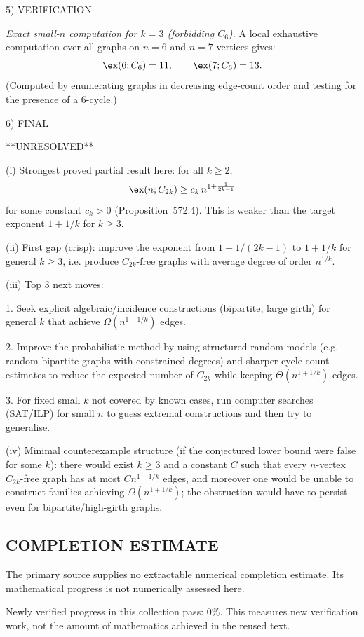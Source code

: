 5) VERIFICATION

\emph{Exact small-$n$ computation for $k=3$ (forbidding $C_6$).}
A local exhaustive computation over all graphs on $n=6$ and $n=7$ vertices gives:
\[
\ex(6;C_6)=11,\qquad \ex(7;C_6)=13.
\]
(Computed by enumerating graphs in decreasing edge-count order and testing for the presence of a $6$-cycle.)

6) FINAL

**UNRESOLVED**

(i) Strongest proved partial result here: for all $k\ge 2$,
\[
\ex(n;C_{2k}) \ge c_k\,n^{1+\frac{1}{2k-1}}
\]
for some constant $c_k>0$ (Proposition~572.4). This is weaker than the target exponent $1+1/k$ for $k\ge 3$.

(ii) First gap (crisp): improve the exponent from $1+1/(2k-1)$ to $1+1/k$ for general $k\ge 3$, i.e. produce $C_{2k}$-free graphs with average degree of order $n^{1/k}$.

(iii) Top 3 next moves:

1. Seek explicit algebraic/incidence constructions (bipartite, large girth) for general $k$ that achieve $\Omega(n^{1+1/k})$ edges.

2. Improve the probabilistic method by using structured random models (e.g. random bipartite graphs with constrained degrees) and sharper cycle-count estimates to reduce the expected number of $C_{2k}$ while keeping $\Theta(n^{1+1/k})$ edges.

3. For fixed small $k$ not covered by known cases, run computer searches (SAT/ILP) for small $n$ to guess extremal constructions and then try to generalise.

(iv) Minimal counterexample structure (if the conjectured lower bound were false for some $k$): there would exist $k\ge 3$ and a constant $C$ such that every $n$-vertex $C_{2k}$-free graph has at most $C n^{1+1/k}$ edges, and moreover one would be unable to construct families achieving $\Omega(n^{1+1/k})$; the obstruction would have to persist even for bipartite/high-girth graphs.


\subsection*{COMPLETION ESTIMATE}
The primary source supplies no extractable numerical completion estimate. Its mathematical progress is not numerically assessed here.

Newly verified progress in this collection pass: $0\%$. This measures new verification work, not the amount of mathematics achieved in the reused text.

